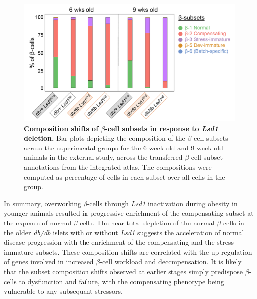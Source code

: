 \begin{figure}[H]
    \centering
    \includegraphics[width=\linewidth]{Chapter5/Fig/F3-17-03.png}
    \caption[Composition shifts of $\beta$-cell subsets in response to \textit{Lsd1} deletion]{\textbf{Composition shifts of $\beta$-cell subsets in response to \textit{Lsd1} deletion.} Bar plots depicting the composition of the $\beta$-cell subsets across the experimental groups for the 6-week-old and 9-week-old animals in the external study, across the transferred $\beta$-cell subset annotations from the integrated atlas. The compositions were computed as percentage of cells in each subset over all cells in the group.}
    \label{fig:chp3_valid_study_composition}
\end{figure}





In summary, overworking $\beta$-cells through \textit{Lsd1} inactivation during obesity in younger animals resulted in progressive enrichment of the compensating subset at the expense of normal $\beta$-cells. The near total depletion of the normal $\beta$-cells in the older \textit{db/db} islets with or without \textit{Lsd1} suggests the acceleration of normal disease progression with the enrichment of the compensating and the stress-immature subsets. These composition shifts are correlated with the up-regulation of genes involved in increased $\beta$-cell workload and decompensation. It is likely that the subset composition shifts observed at earlier stages simply predispose $\beta$-cells to dysfunction and failure, with the compensating phenotype being vulnerable to any subsequent stressors.

